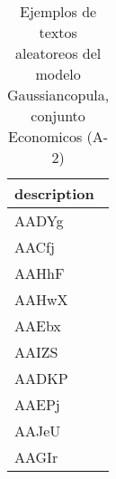 \begin{table}[H]
\centering
\fontsize{8}{14}\selectfont
\caption{Ejemplos de textos aleatoreos del modelo Gaussiancopula, conjunto Economicos (A-2)}
\label{table-sample10-economicos-a-2-gaussiancopula-text}
\begin{tabular}{|m{50em}|}
\hline
\rowcolor[gray]{0.8}
description \\
\hline AADYg \\
\hline AACfj \\
\hline AAHhF \\
\hline AAHwX \\
\hline AAEbx \\
\hline AAIZS \\
\hline AADKP \\
\hline AAEPj \\
\hline AAJeU \\
\hline AAGIr \\
\hline
\end{tabular}
\end{table}
